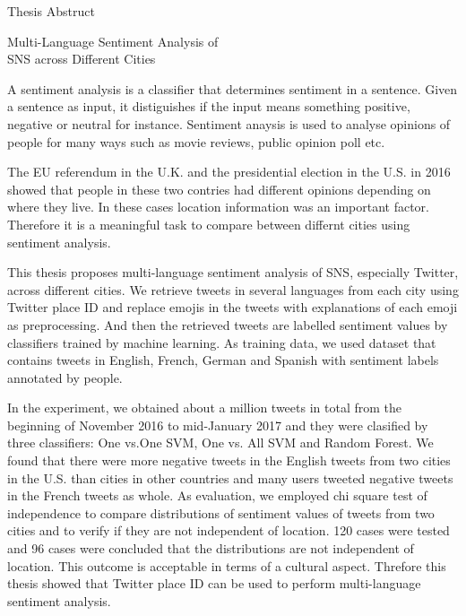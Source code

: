\newpage

\thispagestyle{empty}
\vspace*{2.0cm}

\begin{center}
\LARGE{Thesis Abstruct}
\end{center}
\vspace{3mm}

\begin{center}
\LARGE{Multi-Language Sentiment Analysis of\\SNS across Different Cities}
\end{center}

\vspace{20mm}
\setlength\parindent{2zw}
A sentiment analysis is a classifier that determines sentiment in a sentence.
Given a sentence as input, it distiguishes if the input means something positive, negative or neutral for instance.
Sentiment anaysis is used to analyse opinions of people for many ways such as movie reviews, public opinion poll etc.

The EU referendum in the U.K. and the presidential election in the U.S. in 2016 showed that people in these two contries had different opinions depending on where they live.
In these cases location information was an important factor.
Therefore it is a meaningful task to compare between differnt cities using sentiment analysis.

This thesis proposes multi-language sentiment analysis of SNS, especially Twitter, across different cities.
We retrieve tweets in several languages from each city using Twitter place ID and replace emojis in the tweets with explanations of each emoji as preprocessing.
And then the retrieved tweets are labelled sentiment values by classifiers trained by machine learning.
As training data, we used dataset that contains tweets in English, French, German and Spanish with sentiment labels annotated by people. 

In the experiment, we obtained about a million tweets in total from the beginning of November 2016 to mid-January 2017 and they were clasified by three classifiers: One vs.One SVM, One vs. All SVM and Random Forest.
We found that there were more negative tweets in the English tweets from two cities in the U.S. than cities in other countries and many users tweeted negative tweets in the French tweets as whole. 
As evaluation, we employed chi square test of independence to compare distributions of sentiment values of tweets from two cities and to verify if they are not independent of location.
120 cases were tested and 96 cases were concluded that the distributions are not independent of location.
This outcome is acceptable in terms of a cultural aspect.
Threfore this thesis showed that Twitter place ID can be used to perform multi-language sentiment analysis.

